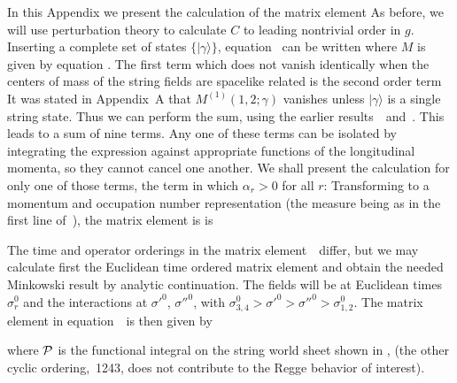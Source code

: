 In this Appendix we present the calculation of the matrix element
\eqn{}
As before, we will use perturbation theory to calculate $C$ to
leading nontrivial order in $g$.  Inserting a complete set of
states $\{ | \gamma \rangle \}$, equation \Cdef\ can be written
\eqn{}
where $M$ is given by equation \Mdef .  The first term which does not
vanish identically when the centers of mass of the string fields are
spacelike related is the second order term
\eqn{}
It was stated in Appendix~A that $M^{(1)}(1,2;\gamma)$ vanishes
unless
$|\gamma\rangle$ is a single string state.  Thus we can perform the
sum, using the earlier results~\Minty\ and~\ancre.  This leads to a
sum
of nine terms.
Any one of these terms can be isolated by integrating
the expression against appropriate functions of the longitudinal
momenta, so they cannot cancel one another.  We shall present the
calculation for only one of those terms, the term in which $\alpha_r
> 0$ for all $r$:
\eqn{}
Transforming to a momentum and occupation number representation
(the measure being as in the first line of~\Mresult), the matrix
element is
is
\eqn{}

The time and operator orderings in the matrix element~\bbone\ differ,
but
we may calculate first the Euclidean time ordered matrix element and
obtain the needed Minkowski result by analytic continuation.  The
fields will be at Euclidean times
$\sigma^0_r$ and the interactions at
$\sigma'^0$, $\sigma''^0$, with
$\sigma^0_{3,4} > \sigma'^0 > \sigma''^0 > \sigma^0_{1,2}$.  The
matrix
element in equation~\bbone\ is then
given by

\ifig{}
{\epsfxsize=5.5cm \epsfysize=3.5cm }

\eqn{}
where $\cal P$ is the functional integral on the
string world sheet shown in \fthree, (the other cyclic
ordering,~1243,
does  not contribute to the Regge behavior of interest).

